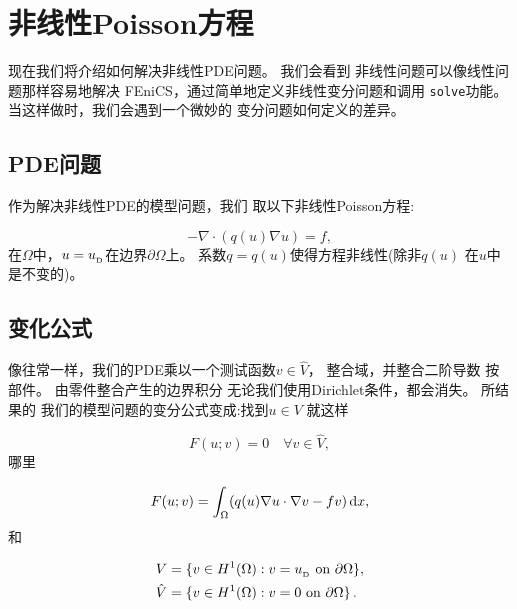 
\section{非线性Poisson方程}
\label{ftut1:gallery:nonlinearpoisson}


现在我们将介绍如何解决非线性PDE问题。 我们会看到
非线性问题可以像线性问题那样容易地解决
FEniCS，通过简单地定义非线性变分问题和调用
\texttt{solve}功能。 当这样做时，我们会遇到一个微妙的
变分问题如何定义的差异。

\subsection{PDE问题}

作为解决非线性PDE的模型问题，我们
取以下非线性Poisson方程:

\begin{equation}
-\nabla\cdot\left(q(u)\nabla u\right) = f,
\end{equation}
在$\Omega$中，$u=\ub$在边界$\partial\Omega$上。
系数$q = q(u)$使得方程非线性(除非$q(u)$
在$u$中是不变的)。

\subsection{变化公式}

像往常一样，我们的PDE乘以一个测试函数$v\in\hat V$，
整合域，并整合二阶导数
按部件。 由零件整合产生的边界积分
无论我们使用Dirichlet条件，都会消失。 所结果的
我们的模型问题的变分公式变成:找到$u \in V$
就这样

\begin{equation}
F(u; v) = 0 \quad \forall v \in \hat{V},
\label{ch:poisson0:nonlinear1}
\end{equation}
哪里

\begin{equation}
F(u; v) = \int_\Omega (q(u)\nabla u\cdot \nabla v - fv) \dx,
\label{ch:poisson0:nonlinear2}
\end{equation}
和

\begin{align*}
     V      &= \{v \in H^1(\Omega) : v = \ub \mbox{ on } \partial\Omega\},\\
    \hat{V} &= \{v \in H^1(\Omega) : v = 0 \mbox{ on } \partial\Omega\}\tp
\end{align*}

